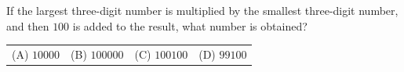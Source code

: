 If the largest three-digit number is multiplied by the smallest three-digit number, and then $100$ is added to the result, what number is obtained?



\begin{tabular}{llll}
(A) $10000$ & (B) $100000$ & (C) $100100$ & (D) $99100$
\end{tabular}
